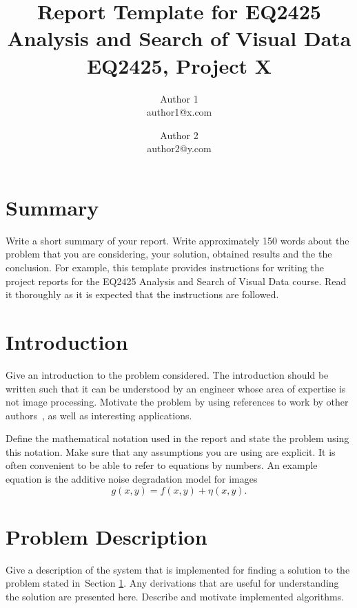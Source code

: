 \documentclass[a4paper]{article}
\begin{document}
\title{Report Template for EQ2425 Analysis and Search of Visual Data\\

\large{EQ2425, Project X}} 

\author{Author 1\\ author1@x.com
  \and Author 2\\ author2@y.com}

\maketitle

\section*{Summary}
\label{sec:summary}

Write a short summary of your report. Write approximately 150 words about the
problem that you are considering, your solution, obtained results and the
the conclusion. For example, this template provides instructions for writing the
project reports for the EQ2425 Analysis and Search of Visual Data course. Read it thoroughly as it
is expected that the instructions are followed.

\section{Introduction}
\label{sec:introduction}

Give an introduction to the problem considered. The introduction should be
written such that it can be understood by an engineer whose area of expertise is
not image processing. Motivate the problem by using references to work by other
authors~\cite{coursebook}, as well as interesting applications.

Define the mathematical notation used in the report and state the problem using
this notation. Make sure that any assumptions you are using are explicit. It is
often convenient to be able to refer to equations by numbers. An example
equation is the additive noise degradation model for images
\begin{equation}
  \label{eqn:model}
  g(x,y) = f(x,y) + \eta(x,y).
\end{equation}

\section{Problem Description}
\label{sec:system}
Give a description of the system that is implemented for finding a solution to
the problem stated in~Section \ref{sec:introduction}. Any derivations that are
useful for understanding the solution are presented here. Describe and motivate
implemented algorithms.
\end{document}
